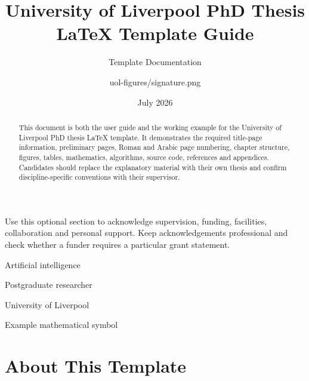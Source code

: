 \documentclass[oneside,header=auto]{liverpoolthesis}
\title{University of Liverpool PhD Thesis LaTeX Template Guide}
\author{Template Documentation}
\date{July 2026}
\begin{document}
\frontmatter
\maketitle

\begin{abstract}
This document is both the user guide and the working example for the University of Liverpool PhD thesis LaTeX template. It demonstrates the required title-page information, preliminary pages, Roman and Arabic page numbering, chapter structure, figures, tables, mathematics, algorithms, source code, references and appendices. Candidates should replace the explanatory material with their own thesis and confirm discipline-specific conventions with their supervisor.
\end{abstract}

\begin{declaration}
\signature{uol-figures/signature.png}
\end{declaration}

\begin{acknowledgements}
Use this optional section to acknowledge supervision, funding, facilities, collaboration and personal support. Keep acknowledgements professional and check whether a funder requires a particular grant statement.
\end{acknowledgements}

\begin{publications}
  \item {}
  \item {}
\end{publications}

\tableofcontents
\listoffigures
\listoftables

\begin{abbreviations}
  \item[AI] Artificial intelligence
  \item[PGR] Postgraduate researcher
  \item[UoL] University of Liverpool
  \item[$\alpha$] Example mathematical symbol
\end{abbreviations}

\mainmatter

\chapter{About This Template}
\end{document}
